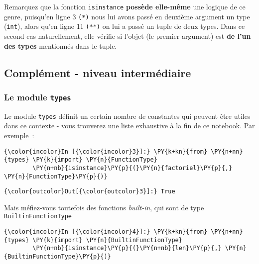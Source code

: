     Remarquez que la fonction \texttt{isinstance} \textbf{possède elle-même}
une logique de ce genre, puisqu'en ligne 3 \texttt{(*)} nous lui avons
passé en deuxième argument un type (\texttt{int}), alors qu'en ligne 11
\texttt{(**)} on lui a passé un tuple de deux types. Dans ce second cas
naturellement, elle vérifie si l'objet (le premier argument) est
\textbf{de l'un des types} mentionnés dans le tuple.

    \hypertarget{compluxe9ment---niveau-intermuxe9diaire}{%
\subsection{Complément - niveau
intermédiaire}\label{compluxe9ment---niveau-intermuxe9diaire}}

    \hypertarget{le-module-types}{%
\subsubsection{\texorpdfstring{Le module
\texttt{types}}{Le module types}}\label{le-module-types}}

    Le module \texttt{types} définit un certain nombre de constantes qui
peuvent être utiles dans ce contexte - vous trouverez une liste
exhaustive à la fin de ce notebook. Par exemple~:

    \begin{Verbatim}[commandchars=\\\{\}]
{\color{incolor}In [{\color{incolor}3}]:} \PY{k+kn}{from} \PY{n+nn}{types} \PY{k}{import} \PY{n}{FunctionType}
        \PY{n+nb}{isinstance}\PY{p}{(}\PY{n}{factoriel}\PY{p}{,} \PY{n}{FunctionType}\PY{p}{)}
\end{Verbatim}


\begin{Verbatim}[commandchars=\\\{\}]
{\color{outcolor}Out[{\color{outcolor}3}]:} True
\end{Verbatim}
            
    Mais méfiez-vous toutefois des fonctions \emph{built-in}, qui sont de
type \texttt{BuiltinFunctionType}

    \begin{Verbatim}[commandchars=\\\{\}]
{\color{incolor}In [{\color{incolor}4}]:} \PY{k+kn}{from} \PY{n+nn}{types} \PY{k}{import} \PY{n}{BuiltinFunctionType}
        \PY{n+nb}{isinstance}\PY{p}{(}\PY{n+nb}{len}\PY{p}{,} \PY{n}{BuiltinFunctionType}\PY{p}{)}
\end{Verbatim}


